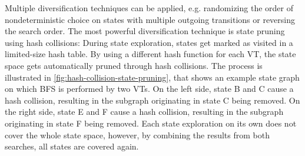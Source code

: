 \documentclass[
fancyheadings, %
%
%
]{stsreprt}
\begin{document}
Multiple diversification techniques can be applied, e.g. randomizing the order of nondeterministic choice on states with multiple outgoing transitions or reversing the search order.
The most powerful diversification technique is state pruning using hash collisions:
During state exploration, states get marked as visited in a limited-size hash table.
By using a different hash function for each VT, the state space gets automatically pruned through hash collisions.
The process is illustrated in \cref{fig:hash-collision-state-pruning}, that shows an example state graph on which BFS is performed by two VTs.
On the left side, state B and C cause a hash collision, resulting in the subgraph originating in state C being removed.
On the right side, state E and F cause a hash collision, resulting in the subgraph originating in state F being removed.
Each state exploration on its own does not cover the whole state space, however, by combining the results from both searches, all states are covered again.
\end{document}
